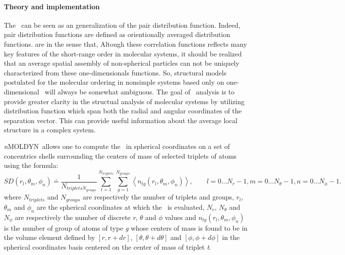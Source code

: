 \documentclass[a4paper,11pt]{report}
\newcommand{\NMOLDYN}{\textit{n}MOLDYN}
\begin{document}
\paragraph{Theory and implementation\\}
\label{sd_theory}
The \SD\ can be seen as an generalization of the pair distribution function. Indeed, pair distribution functions are defined 
as orientionally averaged distribution functions. are  in the sense that,  Altough these correlation functions reflects many 
key features of the short-range order in molecular systems, it should be realized that an average spatial assembly of 
non-spherical particles can not be uniquely characterized from these one-dimensionals functions. So, structural models 
postulated for the molecular ordering in nonsimple systems based only on one-dimensional \PDF\ will always be somewhat 
ambiguous. The goal of \SD\ analysis is to provide greater clarity in the structual analysis of molecular systems by utilizing 
distribution function which span both the radial and angular coordinates of the separation vector. This can provide useful 
information about the average local structure in a complex system.

\NMOLDYN\ allows one to compute the \SD\ in spherical coordinates on a set of concentrics shells surrounding the centers of 
mass of selected triplets of atoms using the formula:
\begin{equation}
\label{eq:sd}
SD(r_l,\theta_m ,\phi_n) \doteq \frac{1}{N_{triplets N_{groups}}}\sum_{t = 1}^{N_{triplets}}\sum_{g = 1}^{N_{groups}} \left\langle n_{tg}(r_l,\theta_m,\phi_n)\right\rangle,
\qquad l = 0\ldots N_r - 1, m = 0\ldots N_{\theta} - 1, n = 0\ldots N_{\phi} - 1.
\end{equation}
where $N_{triplets}$ and $N_{groups}$ are respectively the number of triplets and groups, $r_l$, $\theta_m$ and $\phi_n$ are the spherical coordinates at which the \SD\ is evaluated, 
$N_r$, $N_{\theta}$ and $N_{\phi}$ are respectively the number of discrete \textit{r}, $\theta$ and $\phi$ values and 
$n_{tg}(r_l,\theta_m,\phi_n)$ is the number of group of atoms of type \textit{g} whose centers of mass is found 
to be in the volume element defined by $[r, r+dr]$, $[\theta , \theta + d\theta]$ and $[\phi , \phi + d\phi]$ in the 
spherical coordinates basis centered on the center of mass of triplet \textit{t}.
\end{document}
